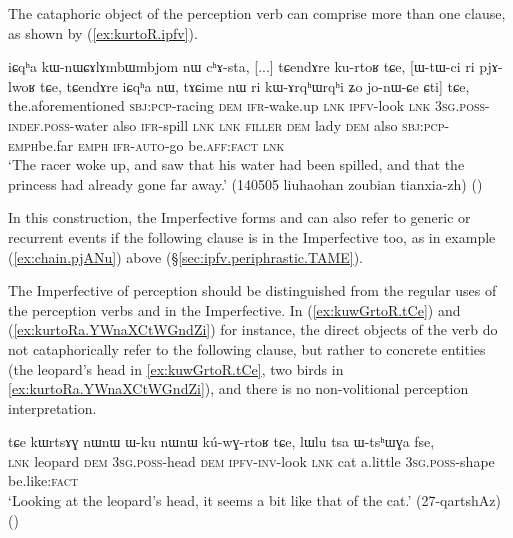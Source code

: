 The cataphoric object of the perception verb can comprise more than one clause, as shown by (\ref{ex:kurtoR.ipfv}).

\begin{exe}
\ex \label{ex:kurtoR.ipfv}
\gll  iɕqʰa kɯ-nɯɕɤlɤmbɯmbjom nɯ cʰɤ-sta, [...] tɕendɤre ku-rtoʁ tɕe, [ɯ-tɯ-ci ri pjɤ-lwoʁ tɕe, tɕendɤre iɕqʰa nɯ, tɤɕime nɯ ri kɯ-ɤrqʰɯ\redp{}rqʰi ʑo jo-nɯ-ɕe ɕti] tɕe, \\
the.aforementioned \textsc{sbj}:\textsc{pcp}-racing \textsc{dem} \textsc{ifr}-wake.up { } \textsc{lnk} \textsc{ipfv}-look \textsc{lnk} \textsc{3sg}.\textsc{poss}-\textsc{indef}.\textsc{poss}-water also \textsc{ifr}-spill  \textsc{lnk} \textsc{lnk} \textsc{filler} \textsc{dem} lady \textsc{dem} also \textsc{sbj}:\textsc{pcp}-\textsc{emph\redp}{}be.far \textsc{emph} \textsc{ifr}-\textsc{auto}-go be.\textsc{aff}:\textsc{fact} \textsc{lnk} \\
\glt `The racer woke up, and saw that his water had been spilled, and that the princess had already gone far away.' (140505 liuhaohan zoubian tianxia-zh)
()
\end{exe}

In this construction, the Imperfective forms  and  can also refer to generic or recurrent events if the following clause is in the Imperfective too, as in example (\ref{ex:chain.pjANu}) above (§\ref{sec:ipfv.periphrastic.TAME}).

The Imperfective of perception should be distinguished from the regular uses of the perception verbs  and  in the Imperfective. In (\ref{ex:kuwGrtoR.tCe}) and (\ref{ex:kurtoRa.YWnaXCtWGndZi}) for instance, the direct objects of the verb  do not cataphorically refer to the following clause, but rather to concrete entities (the leopard's head in \ref{ex:kuwGrtoR.tCe}, two birds in \ref{ex:kurtoRa.YWnaXCtWGndZi}), and there is no non-volitional perception interpretation.


\begin{exe}
\ex \label{ex:kuwGrtoR.tCe}
\gll  tɕe kɯrtsɤɣ nɯnɯ ɯ-ku nɯnɯ kú-wɣ-rtoʁ tɕe, lɯlu tsa ɯ-tsʰɯɣa fse, \\
\textsc{lnk} leopard \textsc{dem} \textsc{3sg}.\textsc{poss}-head \textsc{dem} \textsc{ipfv}-\textsc{inv}-look \textsc{lnk} cat a.little \textsc{3sg}.\textsc{poss}-shape be.like:\textsc{fact} \\
\glt `Looking at the leopard's head, it seems a bit like that of the cat.' (27-qartshAz)
()
\end{exe}

